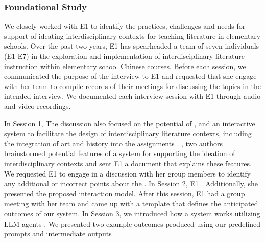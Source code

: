 {\subsubsection{Foundational Study}
We closely worked with E1 to identify the practices, challenges and needs for support of ideating interdisciplinary contexts for teaching literature in elementary schools. 
Over the past two years, E1 has spearheaded a team of seven individuals (E1-E7) in the exploration and implementation of interdisciplinary literature instruction within elementary school Chinese courses. 
Before each session, we communicated the purpose of the interview to E1 and requested that she engage with her team to compile records of their meetings for discussing the topics in the intended interview. 
We documented each interview session with E1 through audio and video recordings. %

In Session 1, 
The discussion also focused on the potential of , and an interactive system to facilitate the design of interdisciplinary literature contexts, including the integration of art and history into the assignments . 
, two authors brainstormed potential features of a system for supporting the ideation of interdisciplinary contexts and sent E1 a document that explains these features. %
We requested E1 to engage in a discussion with her group members to identify any additional or incorrect points about the . 
In Session 2, E1 .
Additionally, she presented the proposed interaction model. 
After this session, E1 had a group meeting with her team and came up with a template that defines the anticipated outcomes of our system. 
In Session 3, we introduced how a system works utilizing LLM agents . 
We presented two example outcomes produced using our predefined prompts and intermediate outputs 
}


